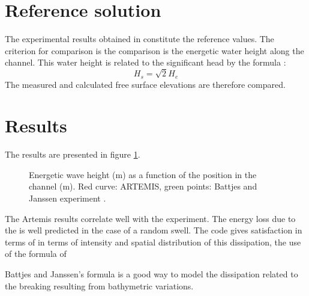 \section{Reference solution}

The experimental results obtained in \cite{Battjes1978} constitute the reference values.
The criterion for comparison is the comparison is the energetic water height along the
channel. This water height is related to the significant head by the formula :
$$
H_s = \sqrt{2} H_e
$$
The measured and calculated free surface elevations are therefore compared.

\section{ Results}

The results are presented in figure \ref{fig:bj78_res}.
\begin{figure}[h]
\begin{center}
\end{center}
\caption{Energetic wave height (m) as a function of the position in the channel (m).
Red curve: ARTEMIS, green points: Battjes and Janssen experiment \cite{Battjes1978}.}
\label{fig:bj78_res}
\end{figure}

The Artemis results correlate well with the experiment. The energy loss due to the
is well predicted in the case of a random swell. The code gives satisfaction in terms of
in terms of intensity and spatial distribution of this dissipation, the use of the
formula of

Battjes and Janssen's formula is a good way to model the dissipation related to the
breaking resulting from bathymetric variations.




